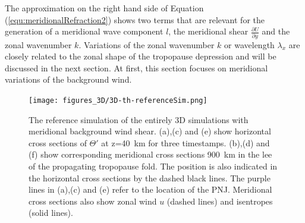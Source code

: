 The approximation on the right hand side of Equation (\ref{equ:meridionalRefraction2}) shows two terms that are relevant for the generation of a meridional wave component $l$, the meridional shear $\frac{\partial U}{\partial y}$ and the zonal wavenumber $k$. Variations of the zonal wavenumber $k$ or wavelength $\lambda_x$ are closely related to the zonal shape of the tropopause depression and will be discussed in the next section. At first, this section focuses on meridional variations of the background wind.

\begin{figure}[tbp]
    \centering
    \texttt{[image: figures\_3D/3D-th-referenceSim.png]}
    \caption{The reference simulation of the entirely 3D simulations with meridional background wind shear. (a),(c) and (e) show horizontal cross sections of $\Theta'$ at z=\SI{40}{\kilo\meter} for three timestamps. (b),(d) and (f) show corresponding meridional cross sections \SI{900}{\kilo\meter} in the lee of the propagating tropopause fold. The position is also indicated in the horizontal cross sections by the dashed black lines. The purple lines in (a),(c) and (e) refer to the location of the PNJ. Meridional cross sections also show zonal wind $u$ (dashed lines) and isentropes (solid lines).}
    \label{fig:3D-reference}
\end{figure}
